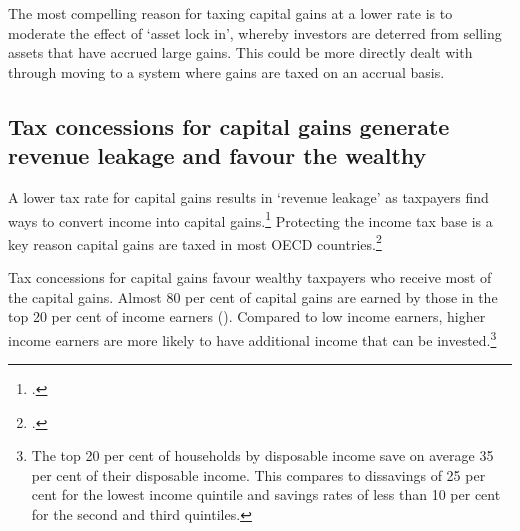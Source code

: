 \documentclass{grattan}\usepackage[]{graphicx}\usepackage[]{color}
\begin{document}
The most compelling reason for taxing capital gains at a lower rate is to moderate the effect of `asset lock in', whereby investors are deterred from selling assets that have accrued large gains. This could be more directly dealt with through moving to a system where gains are taxed on an accrual basis.  

\subsection{Tax concessions for capital gains generate revenue leakage and favour the wealthy}
A lower tax rate for capital gains results in `revenue leakage' as taxpayers find ways to convert income into capital gains.\footcites{Evans2005}{Minas2013}  Protecting the income tax base is a key reason capital gains are taxed in most OECD countries.\footcite{OECD2006b}

Tax concessions for capital gains favour wealthy taxpayers who receive most of the capital gains. Almost 80 per cent of capital gains are earned by those in the top 20 per cent of income earners (). Compared to low income earners, higher income earners are more likely to have additional income that can be invested.\footnote{The top 20 per cent of households by disposable income save on average 35 per cent of their disposable income. This compares to dissavings of 25 per cent for the lowest income quintile and savings rates of less than 10 per cent for the second and third quintiles.}
\end{document}
